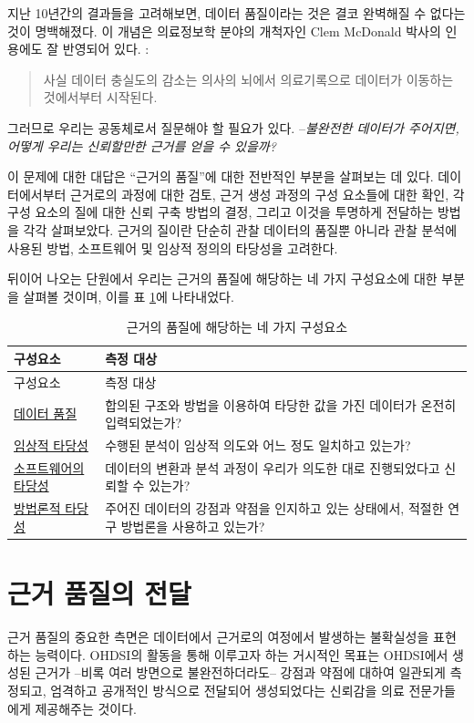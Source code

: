\documentclass[11pt]{book}
\theoremstyle{definition}
\theoremstyle{definition}
\theoremstyle{definition}
\theoremstyle{remark}
\begin{document}
지난 10년간의 결과들을 고려해보면, 데이터 품질이라는 것은 결코 완벽해질
수 없다는 것이 명백해졌다. 이 개념은 의료정보학 분야의 개척자인 Clem
McDonald 박사의 인용에도 잘 반영되어 있다. :

\begin{quote}
사실 데이터 충실도의 감소는 의사의 뇌에서 의료기록으로 데이터가 이동하는
것에서부터 시작된다. 
\end{quote}

그러므로 우리는 공동체로서 질문해야 할 필요가 있다. --\emph{불완전한
데이터가 주어지면, 어떻게 우리는 신뢰할만한 근거를 얻을 수 있을까?}

이 문제에 대한 대답은 ``근거의 품질''에 대한 전반적인 부분을 살펴보는 데
있다. 데이터에서부터 근거로의 과정에 대한 검토, 근거 생성 과정의 구성
요소들에 대한 확인, 각 구성 요소의 질에 대한 신뢰 구축 방법의 결정,
그리고 이것을 투명하게 전달하는 방법을 각각 살펴보았다. 근거의 질이란
단순히 관찰 데이터의 품질뿐 아니라 관찰 분석에 사용된 방법, 소프트웨어
및 임상적 정의의 타당성을 고려한다. 

뒤이어 나오는 단원에서 우리는 근거의 품질에 해당하는 네 가지 구성요소에
대한 부분을 살펴볼 것이며, 이를 표 \ref{tab:evidenceQuality}에
나타내었다.

\begin{longtable}[]{@{}ll@{}}
\caption{\label{tab:evidenceQuality} 근거의 품질에 해당하는 네 가지
구성요소}\tabularnewline
\toprule
구성요소 & 측정 대상\tabularnewline
\midrule
\endfirsthead
\toprule
구성요소 & 측정 대상\tabularnewline
\midrule
\endhead
\href{DataQuality.html}{데이터 품질} & 합의된 구조와 방법을 이용하여
타당한 값을 가진 데이터가 온전히 입력되었는가?\tabularnewline
\href{ClinicalValidity.html}{임상적 타당성} & 수행된 분석이 임상적
의도와 어느 정도 일치하고 있는가?\tabularnewline
\href{SoftwareValidity.html}{소프트웨어의 타당성} & 데이터의 변환과 분석
과정이 우리가 의도한 대로 진행되었다고 신뢰할 수 있는가?\tabularnewline
\href{MethodValidity.html}{방법론적 타당성} & 주어진 데이터의 강점과
약점을 인지하고 있는 상태에서, 적절한 연구 방법론을 사용하고
있는가?\tabularnewline
\bottomrule
\end{longtable}

\section{근거 품질의 전달}\label{--}

근거 품질의 중요한 측면은 데이터에서 근거로의 여정에서 발생하는
불확실성을 표현하는 능력이다. OHDSI의 활동을 통해 이루고자 하는 거시적인
목표는 OHDSI에서 생성된 근거가 --비록 여러 방면으로 불완전하더라도--
강점과 약점에 대하여 일관되게 측정되고, 엄격하고 공개적인 방식으로
전달되어 생성되었다는 신뢰감을 의료 전문가들에게 제공해주는 것이다.
\end{document}
